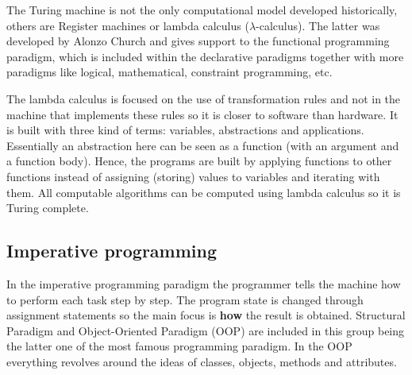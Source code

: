 The Turing machine is not the only computational model developed historically,
others are Register machines or lambda calculus ($\lambda$-calculus).
The latter was developed by Alonzo Church and gives support to the functional programming paradigm, 
which is included within the declarative paradigms together with more paradigms like logical, mathematical, constraint programming, etc.

The lambda calculus is focused on the use of transformation rules and 
not in the machine that implements these rules so it is closer to software than hardware.
It is built with three kind of terms: variables, abstractions and applications. 
Essentially an abstraction here can be seen as a function (with an argument and a function body). 
Hence, the programs are built by applying functions to other functions instead of 
assigning (storing) values to variables and iterating with them. 
All computable algorithms can be computed using lambda calculus so it is Turing complete.







        \vspace{-.5cm}
        \subsection*{Imperative programming}
        \vspace{-.5cm}
In the imperative programming paradigm the programmer tells the machine how to perform each task step by step. 
The program state is changed through assignment statements so the main focus is \textbf{how} the result is obtained. 
Structural Paradigm and Object-Oriented Paradigm (OOP) are included in this group being the latter one of the most famous programming paradigm. 
In the OOP everything revolves around the ideas of classes, objects, methods and attributes.

